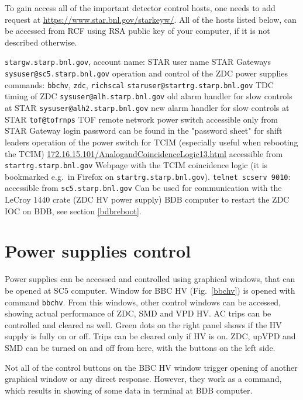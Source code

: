 To gain access all of the important detector control hosts, one needs to add request at \url{https://www.star.bnl.gov/starkeyw/}. All of the hosts listed below, can be accessed from RCF using RSA public key of your computer, if it is not described otherwise.
\begin{outline}
 \1 \texttt{stargw.starp.bnl.gov}, account name: STAR user name
   \2 STAR Gateways
 \1 \texttt{sysuser@sc5.starp.bnl.gov} 
   \2 operation and control of the ZDC power supplies
   \2 commands: \texttt{bbchv}, \texttt{zdc}, \texttt{richscal}
 \1 \texttt{staruser@startrg.starp.bnl.gov}
   \2 TDC timing of ZDC
 \1 \texttt{sysuser@alh.starp.bnl.gov} 
   \2 old alarm handler for slow controls at STAR
 \1 \texttt{sysuser@alh2.starp.bnl.gov}
   \2 new alarm handler for slow controls at STAR
 \1 \texttt{tof@tofrnps}
   \2 TOF remote network power switch
   \2 accessible only from STAR Gateway
   \2 login password can be found in the "password sheet" for shift leaders
   \2 operation of the power switch for TCIM (especially useful when rebooting the TCIM)
 \1 \url{172.16.15.101/AnalogandCoincidenceLogic13.html}
   \2 accessible from \texttt{startrg.starp.bnl.gov}
   \2 Webpage with the TCIM coincidence logic (it is bookmarked e.g.\ in Firefox on \texttt{startrg.starp.bnl.gov}).
 \1 \texttt{telnet scserv 9010}: 
   \2 accessible  from \texttt{sc5.starp.bnl.gov}
   \2 Can be used for communication with the LeCroy 1440 crate (ZDC HV power supply)
   \2 BDB computer
   \2 to restart the ZDC IOC on BDB, see section \ref{bdbreboot}.
\end{outline}


\section{Power supplies control}
Power supplies can be accessed and controlled using graphical windows, that can be opened at SC5 computer. 
Window for BBC HV (Fig.~\ref{bbchv}) is opened with command \texttt{bbchv}. From this windows, other control windows can be accessed, showing actual performance of ZDC, SMD and VPD HV. AC trips can be controlled and cleared as well. Green dots on the right panel shows if the HV supply is fully on or off. Trips can be cleared only if HV is on. ZDC, upVPD and SMD can be turned on and off from here, with the buttons on the left side.

Not all of the control buttons on the BBC HV window trigger opening of another graphical window or any direct response. However, they work as a command, which results in showing of some data in terminal at BDB computer.

